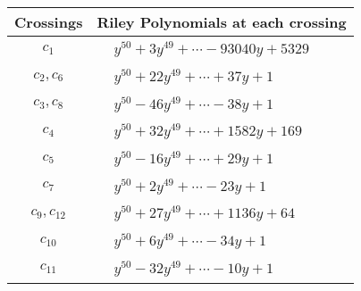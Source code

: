 \documentclass[1p]{elsarticle_modified}
\theoremstyle{definition}
\begin{document}
\begin{tabular}{m{50pt}|m{274pt}}
Crossings & \hspace{64pt}Riley Polynomials at each crossing \\
\hline $$\begin{aligned}c_{1}\end{aligned}$$&$\begin{aligned}
&y^{50}+3 y^{49}+\cdots-93040 y+5329
\end{aligned}$\\
\hline $$\begin{aligned}c_{2},c_{6}\end{aligned}$$&$\begin{aligned}
&y^{50}+22 y^{49}+\cdots+37 y+1
\end{aligned}$\\
\hline $$\begin{aligned}c_{3},c_{8}\end{aligned}$$&$\begin{aligned}
&y^{50}-46 y^{49}+\cdots-38 y+1
\end{aligned}$\\
\hline $$\begin{aligned}c_{4}\end{aligned}$$&$\begin{aligned}
&y^{50}+32 y^{49}+\cdots+1582 y+169
\end{aligned}$\\
\hline $$\begin{aligned}c_{5}\end{aligned}$$&$\begin{aligned}
&y^{50}-16 y^{49}+\cdots+29 y+1
\end{aligned}$\\
\hline $$\begin{aligned}c_{7}\end{aligned}$$&$\begin{aligned}
&y^{50}+2 y^{49}+\cdots-23 y+1
\end{aligned}$\\
\hline $$\begin{aligned}c_{9},c_{12}\end{aligned}$$&$\begin{aligned}
&y^{50}+27 y^{49}+\cdots+1136 y+64
\end{aligned}$\\
\hline $$\begin{aligned}c_{10}\end{aligned}$$&$\begin{aligned}
&y^{50}+6 y^{49}+\cdots-34 y+1
\end{aligned}$\\
\hline $$\begin{aligned}c_{11}\end{aligned}$$&$\begin{aligned}
&y^{50}-32 y^{49}+\cdots-10 y+1
\end{aligned}$\\
\hline
\end{tabular}\\~\\
\end{document}

